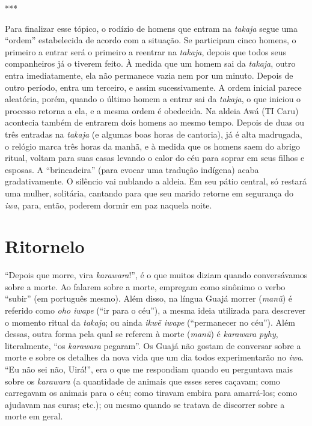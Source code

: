 ***

Para finalizar esse tópico, o rodízio de homens que entram na
\emph{takaja} segue uma ``ordem'' estabelecida de acordo com a situação.
Se participam cinco homens, o primeiro a entrar será o primeiro a
reentrar na \emph{takaja}, depois que todos seus companheiros já o
tiverem feito. À medida que um homem sai da \emph{takaja}, outro entra
imediatamente, ela não permanece vazia nem por um minuto. Depois de
outro período, entra um terceiro, e assim sucessivamente. A ordem
inicial parece aleatória, porém, quando o último homem a entrar sai da
\emph{takaja}, o que iniciou o processo retorna a ela, e a mesma ordem é
obedecida. Na aldeia Awá (TI Caru) acontecia também de entrarem dois
homens ao mesmo tempo. Depois de duas ou três entradas na \emph{takaja}
(e algumas boas horas de cantoria), já é alta madrugada, o relógio marca
três horas da manhã, e à medida que os homens saem do abrigo ritual,
voltam para suas casas levando o calor do céu para soprar em seus filhos
e esposas. A ``brincadeira'' (para evocar uma tradução indígena) acaba
gradativamente. O silêncio vai nublando a aldeia. Em seu pátio central,
só restará uma mulher, solitária, cantando para que seu marido retorne
em segurança do \emph{iwa}, para, então, poderem dormir em paz naquela
noite.

\section{Ritornelo}\label{ritornelo}

``Depois que morre, vira \emph{karawara}!'', é o que muitos diziam quando
conversávamos sobre a morte. Ao falarem sobre a morte, empregam como
sinônimo o verbo ``subir'' (em português mesmo). Além disso, na língua
Guajá morrer (\emph{manũ}) é referido como \emph{oho iwape} (``ir para o
céu''), a mesma ideia utilizada para descrever o momento ritual da
\emph{takaja}; ou ainda \emph{ikwẽ iwape} (``permanecer no céu''). Além
dessas, outra forma pela qual se referem à morte (\emph{manũ}) é
\emph{karawara} \emph{pyhy}, literalmente, ``os \emph{karawara} pegaram''.
Os Guajá não gostam de conversar sobre a morte e sobre os detalhes da
nova vida que um dia todos experimentarão no \emph{iwa}. ``Eu não sei
não, Uirá!'', era o que me respondiam quando eu perguntava mais sobre os
\emph{karawara} (a quantidade de animais que esses seres caçavam; como
carregavam os animais para o céu; como tiravam embira para amarrá-los;
como ajudavam nas curas; etc.); ou mesmo quando se tratava de discorrer
sobre a morte em geral.

